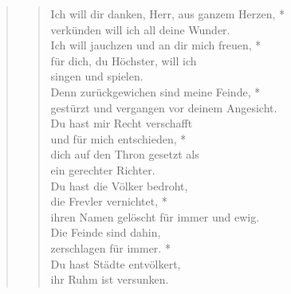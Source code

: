 \begin{quote}
\begin{verse}
Ich will dir danken, Herr, aus ganzem Herzen, *\\
verkünden will ich all deine Wunder.\\
\vin Ich will jauchzen und an dir mich freuen, *\\
\vin für dich, du Höchster, will ich \\ 
\vin singen und spielen.\\
Denn zurückgewichen sind meine Feinde, *\\
gestürzt und vergangen vor deinem Angesicht.\\
\vin Du hast mir Recht verschafft\\ 
\vin und für mich entschieden, *\\
\vin dich auf den Thron gesetzt als\\ 
\vin ein gerechter Richter.\\
Du hast die Völker bedroht,\\
die Frevler vernichtet, *\\
ihren Namen gelöscht für immer und ewig.\\
\vin Die Feinde sind dahin,\\ 
\vin zerschlagen für immer. *\\
\vin Du hast Städte entvölkert,\\
\vin ihr Ruhm ist versunken.\\


\end{verse}
\end{quote}